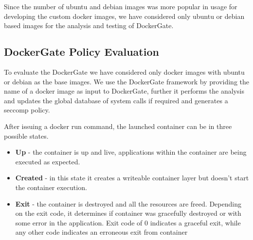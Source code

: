 Since the number of ubuntu and debian images was more popular in usage for developing the custom docker images, we have considered only ubuntu or debian based images for the analysis and testing of DockerGate.

\begin{table}
\centering
\label{topbaseimages}
\caption{Top 10 base images used in building a Docker Image}
\end{table}

\subsection{DockerGate Policy Evaluation}

To evaluate the DockerGate we have considered only docker images with ubuntu or debian as the base images. We use the DockerGate framework by providing the name of a docker image as input to DockerGate, further it performs the analysis and updates the global database of system calls if required and generates a seccomp  policy. 

After issuing a docker run command, the launched container can be in three possible states. 
\begin{itemize}
\item \textbf{Up} - the container is up and live, applications within the container are being executed as expected.
\item \textbf{Created} - in this state it creates a writeable container layer but doesn’t start the container execution.
\item \textbf{Exit} - the container is destroyed and all the resources are freed. Depending on the exit code, it determines if container was gracefully destroyed or with some error in the application. Exit code of 0 indicates a graceful exit, while any other code indicates an erroneous exit from container
\end{itemize}

